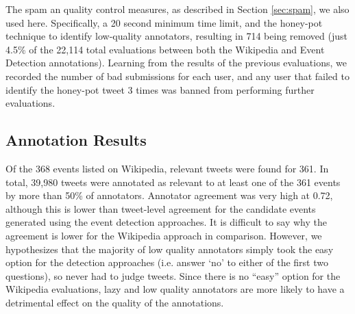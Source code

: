The spam an quality control measures, as described in Section \ref{sec:spam}, we also used here.
Specifically, a 20 second minimum time limit, and the honey-pot technique to identify low-quality annotators, resulting in 714 being removed (just 4.5\% of the 22,114 total evaluations between both the Wikipedia and Event Detection annotations).
Learning from the results of the previous evaluations, we recorded the number of bad submissions for each user, and any user that failed to identify the honey-pot tweet 3 times was banned from performing further evaluations.


\subsection{Annotation Results}
Of the 368 events listed on Wikipedia, relevant tweets were found for 361.
In total, 39,980 tweets were annotated as relevant to at least one of the 361 events by more than 50\% of annotators.
Annotator agreement was very high at 0.72, although this is lower than tweet-level agreement for the candidate events generated using the event detection approaches.
It is difficult to say why the agreement is lower for the Wikipedia approach in comparison.
However, we hypothesizes that the majority of low quality annotators simply took the easy option for the detection approaches (i.e. answer `no' to either of the first two questions), so never had to judge tweets.
Since there is no ``easy'' option for the Wikipedia evaluations, lazy and low quality annotators are more likely to have a detrimental effect on the quality of the annotations.